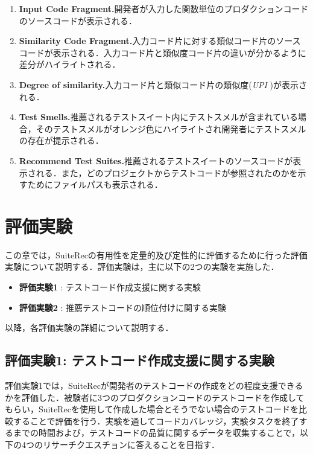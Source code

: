 \documentclass[12pt]{jarticle} %
\begin{document}
\begin{enumerate}
\renewcommand{\labelenumi}{(\arabic{enumi})}
\item{\textbf{Input Code Fragment.}開発者が入力した関数単位のプロダクションコードのソースコードが表示される．}
\item{\textbf{Similarity Code Fragment.}入力コード片に対する類似コード片のソースコードが表示される．入力コード片と類似度コード片の違いが分かるように差分がハイライトされる．}
\item{\textbf{Degree of similarity.}入力コード片と類似コード片の類似度({\it UPI} )が表示される．}
\item{\textbf{Test Smells.}推薦されるテストスイート内にテストスメルが含まれている場合，そのテストスメルがオレンジ色にハイライトされ開発者にテストスメルの存在が提示される．}
\item{\textbf{Recommend Test Suites.}推薦されるテストスイートのソースコードが表示される．また，どのプロジェクトからテストコードが参照されたのかを示すためにファイルパスも表示される．}
\end{enumerate}

\newpage
\section{評価実験}

この章では，{\sf SuiteRec}の有用性を定量的及び定性的に評価するために行った評価実験について説明する．評価実験は，主に以下の2つの実験を実施した．

\begin{itemize}
\item \textbf{評価実験1} : テストコード作成支援に関する実験
\item \textbf{評価実験2} : 推薦テストコードの順位付けに関する実験
\end{itemize}

以降，各評価実験の詳細について説明する．

\subsection{評価実験1: テストコード作成支援に関する実験}
評価実験1では，{\sf SuiteRec}が開発者のテストコードの作成をどの程度支援できるかを評価した．被験者に3つのプロダクションコードのテストコードを作成してもらい，{\sf SuiteRec}を使用して作成した場合とそうでない場合のテストコードを比較することで評価を行う．実験を通してコードカバレッジ，実験タスクを終了するまでの時間および，テストコードの品質に関するデータを収集することで，以下の4つのリサーチクエスチョンに答えることを目指す．
\end{document}
